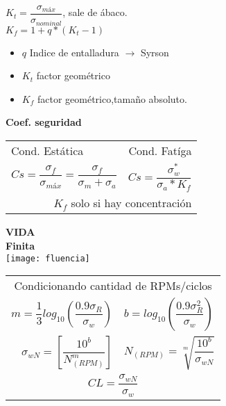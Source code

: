 \documentclass[11pt,a4paper]{article}
\begin{document}
\begin{multicols}{2}
\begin{cajita}
	$K_{t}=\dfrac{\sigma_{máx}}{\sigma_{nominal}}$, sale de ábaco.\\ \vspace*{0.2cm}
	$K_{f}=1+q*\left(K_{t}-1\right)$
		\begin{itemize}[itemsep=-2mm]
		\item $q$ Indice de entalladura $\rightarrow$ Syrson
		\item $K_{t}$ factor geométrico
		\item $K_{f}$ factor geométrico,tamaño absoluto.
	\end{itemize}

	\textbf{Coef. seguridad}\\
		\begin{tabular}{l r}
			\hline
			Cond. Estática & Cond. Fatíga\\
			$Cs=\dfrac{\sigma_{f}}{\sigma_{máx}}=\dfrac{\sigma_{f}}{\sigma_{m}+\sigma_{a}}$ & $Cs=\dfrac{\sigma_{w}^{*}}{\sigma_{a}*K_{f}}$ \\
			\multicolumn{2}{r}{ $K_{f}$ solo si hay concentración} \\
			\hline
		\end{tabular}
	
	\newpage
	
	\textbf{VIDA}\\
	\textbf{Finita}\\
	

	\texttt{[image: fluencia]}
	
	
	
	
	
	\begin{tabular}{r l }
		\multicolumn{2}{c}{Condicionando cantidad de RPMs/ciclos}\\
		$m=\dfrac{1}{3}log_{10}\left(\dfrac{0.9\sigma_{R}}{\sigma_{w}}\right)$&
		$b=log_{10}\left(\dfrac{0.9\sigma_{R}^{2}}{\sigma_{w}}\right)$\\[0.5cm]
		$\sigma_{wN}=\left[\dfrac{10^{b}}{N_{(RPM)}^{m}}\right]$& $N_{(RPM)}=\sqrt[m]{\dfrac{10^{b}}{\sigma_{wN}}}$\\[0.5cm]
		\multicolumn{2}{c}{$CL=\dfrac{\sigma_{wN}}{\sigma_{w}}$}\\
	\end{tabular}


\end{cajita}
\end{multicols}
\end{document}
